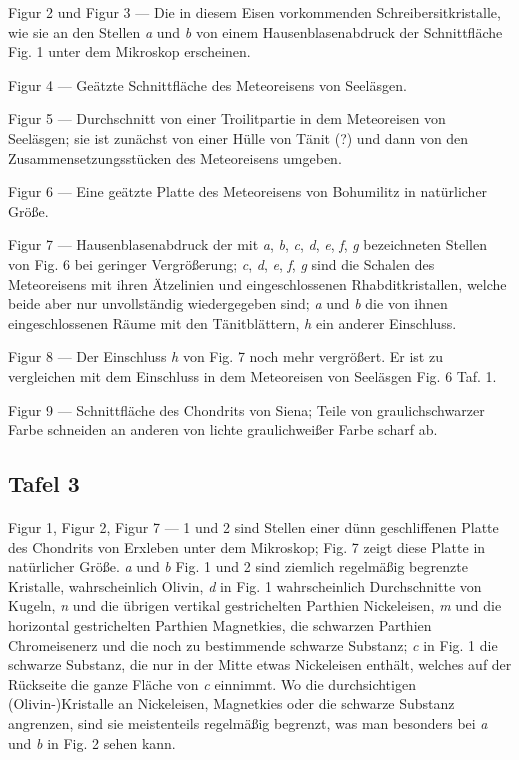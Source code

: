 \documentclass[a4paper, 11pt, oneside]{article}
\begin{document}
Figur 2 und Figur 3 --- Die in diesem Eisen vorkommenden Schreibersitkristalle, wie sie an den Stellen \emph{a} und \emph{b} von einem Hausenblasenabdruck der Schnittfläche Fig. 1 unter dem Mikroskop erscheinen.

Figur 4 --- Geätzte Schnittfläche des Meteoreisens von Seeläsgen.

Figur 5 --- Durchschnitt von einer Troilitpartie in dem Meteoreisen von Seeläsgen; sie ist zunächst von einer Hülle von Tänit (?) und dann von den Zusammensetzungsstücken des Meteoreisens umgeben.

Figur 6 --- Eine geätzte Platte des Meteoreisens von Bohumilitz in natürlicher Größe.

Figur 7 --- Hausenblasenabdruck der mit \emph{a}, \emph{b}, \emph{c}, \emph{d}, \emph{e}, \emph{f}, \emph{g} bezeichneten Stellen von Fig. 6 bei geringer Vergrößerung; \emph{c}, \emph{d}, \emph{e}, \emph{f}, \emph{g} sind die Schalen des Meteoreisens mit ihren Ätzelinien und eingeschlossenen Rhabditkristallen, welche beide aber nur unvollständig wiedergegeben sind; \emph{a} und \emph{b} die von ihnen eingeschlossenen Räume mit den Tänitblättern, \emph{h} ein anderer Einschluss.

Figur 8 --- Der Einschluss \emph{h} von Fig. 7 noch mehr vergrößert. Er ist zu vergleichen mit dem Einschluss in dem Meteoreisen von Seeläsgen Fig. 6 Taf. 1.

Figur 9 --- Schnittfläche des Chondrits von Siena; Teile von graulichschwarzer Farbe schneiden an anderen von lichte graulichweißer Farbe scharf ab.

\subsection{Tafel 3}
\paragraph{}
Figur 1, Figur 2, Figur 7 --- 1 und 2 sind Stellen einer dünn geschliffenen Platte des Chondrits von Erxleben unter dem Mikroskop; Fig. 7 zeigt diese Platte in natürlicher Größe. \emph{a} und \emph{b} Fig. 1 und 2 sind ziemlich regelmäßig begrenzte Kristalle, wahrscheinlich Olivin, \emph{d} in Fig. 1 wahrscheinlich Durchschnitte von Kugeln, \emph{n} und die übrigen vertikal gestrichelten Parthien Nickeleisen, \emph{m} und die horizontal gestrichelten Parthien Magnetkies, die schwarzen Parthien Chromeisenerz und die noch zu bestimmende schwarze Substanz; \emph{c} in Fig. 1 die schwarze Substanz, die nur in der Mitte etwas Nickeleisen enthält, welches auf der Rückseite die ganze Fläche von \emph{c} einnimmt. Wo die durchsichtigen (Olivin-)Kristalle an Nickeleisen, Magnetkies oder die schwarze Substanz angrenzen, sind sie meistenteils regelmäßig begrenzt, was man besonders bei \emph{a} und \emph{b} in Fig. 2 sehen kann.
\end{document}
